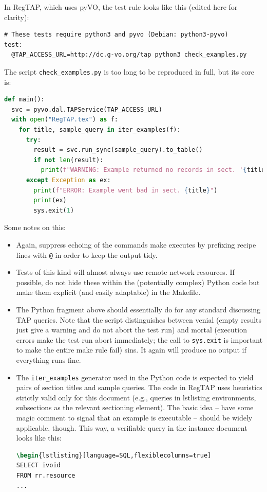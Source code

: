 \documentclass[11pt,a4paper]{ivoa}
\begin{document}
In RegTAP, which uses pyVO, the test rule looks like this
(edited here for clarity):

\begin{lstlisting}[basicstyle=\footnotesize]
# These tests require python3 and pyvo (Debian: python3-pyvo)
test:
  @TAP_ACCESS_URL=http://dc.g-vo.org/tap python3 check_examples.py
\end{lstlisting}

The script \verb|check_examples.py| is too long to be reproduced in
full, but its core is:

\begin{lstlisting}[language=python,basicstyle=\footnotesize]
def main():
  svc = pyvo.dal.TAPService(TAP_ACCESS_URL)
  with open("RegTAP.tex") as f:
    for title, sample_query in iter_examples(f):
      try:
        result = svc.run_sync(sample_query).to_table()
        if not len(result):
          print(f"WARNING: Example returned no records in sect. '{title}'")
      except Exception as ex:
        print(f"ERROR: Example went bad in sect. {title}")
        print(ex)
        sys.exit(1)
\end{lstlisting}

Some notes on this:

\begin{itemize}
\item Again, suppress echoing of the commands make executes by prefixing recipe
lines with \verb|@| in order to keep the output tidy.

\item Tests of this kind will almost always use remote network
resources.  If possible, do not hide these within the (potentially
complex) Python code but make them explicit (and easily adaptable) in
the Makefile.

\item The Python fragment above should essentially do for any standard
discussing TAP queries. Note that the script distinguishes between
venial (empty results just give a warning and do not abort the
test run) and mortal (execution errors make the test run abort
immediately; the call to \verb|sys.exit| is important to make the entire
make rule fail) sins. It again will produce no output if everything runs
fine.

\item The \verb|iter_examples| generator used in the Python code is expected
to yield pairs of section titles and sample queries.  The code in RegTAP
uses heuristics strictly valid only for this document (e.g., queries in
lstlisting environments, subsections as the relevant sectioning
element).  The basic idea -- have some magic comment to signal that an
example is executable -- should be widely applicable, though.
This way, a verifiable query in the instance document looks like
this:
\begin{lstlisting}[language=tex,basicstyle=\footnotesize]
%CHECK_HERE
\begin{lstlisting}[language=SQL,flexiblecolumns=true]
SELECT ivoid
FROM rr.resource
...
\end{lstlisting}

\end{itemize}
\end{document}
